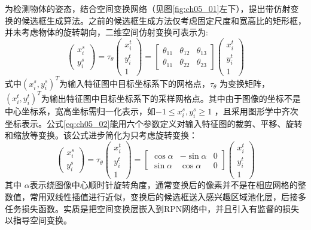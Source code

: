 为检测物体的姿态，结合空间变换网络\citep{Jaderberg2015}（见图\ref{fig:ch05_01}左下），提出带仿射变换的候选框生成算法。之前的候选框生成方法仅考虑固定尺度和宽高比的矩形框，并未考虑物体的旋转朝向，二维空间仿射变换可表示为:
\begin{equation} \label{eq:ch05_02}
\begin{pmatrix}
x_{i}^{s}\\ 
y_{i}^{s}
\end{pmatrix} =\tau _{\theta}\begin{pmatrix}
x_{i}^{t}\\ 
y_{i}^{t}\\
1
\end{pmatrix}=\begin{bmatrix}
\theta_{11} &\theta_{12}  &\theta_{13} \\ 
 \theta_{11}&\theta_{22}  & \theta_{23}
\end{bmatrix}\begin{pmatrix}
x_{i}^{t}\\ 
y_{i}^{t}\\
1
\end{pmatrix}
\end{equation}                    
式中$(x_{i}^{s},y_{i}^{s})^T $为输入特征图中目标坐标系下的网格点，$\tau _{\theta}$ 为变换矩阵， $(x_{i}^{t},y_{i}^{t})^T $为输出特征图中目标坐标系下的采样网格点。其中由于图像的坐标不是中心坐标系，宽高坐标需归一化表示，如$-1\leq x_{i}^{s},y_{i}^{s}\geq 1$ ，且采用图形学中齐次坐标表示。公式\ref{eq:ch05_02}能用六个参数定义对输入特征图的裁剪、平移、旋转和缩放等变换。该公式进步简化为只考虑旋转变换：
\begin{equation} \label{eq:ch05_03}
\begin{pmatrix}
x_{i}^{s}\\ 
y_{i}^{s}
\end{pmatrix} =\tau _{\theta}\begin{pmatrix}
x_{i}^{t}\\ 
y_{i}^{t}\\
1
\end{pmatrix}=\begin{bmatrix}
\cos\alpha &-\sin\alpha  &0 \\ 
 \sin\alpha&\cos\alpha  & 0
\end{bmatrix}\begin{pmatrix}
x_{i}^{t}\\ 
y_{i}^{t}\\
1
\end{pmatrix}
\end{equation}  
其中 $\alpha$表示绕图像中心顺时针旋转角度，通常变换后的像素并不是在相应网格的整数值，常用双线性插值进行近似，变换后的候选框送入感兴趣区域池化层，后接多任务损失函数。实质是把空间变换层嵌入到RPN网络中，并且引入有监督的损失以指导空间变换。
